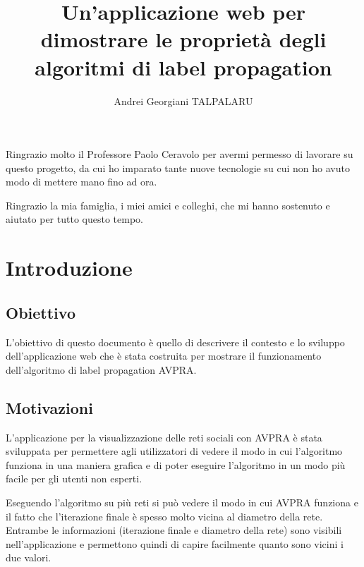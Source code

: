 \documentclass[a4paper,12pt]{report}
\begin{document}

\setcounter{secnumdepth}{5}
\setcounter{tocdepth}{5}

\title{Un'applicazione web per dimostrare le proprietà degli algoritmi di label propagation}
\author{Andrei Georgiani TALPALARU}

\beforepreface
{}
Ringrazio molto il Professore Paolo Ceravolo per avermi permesso di lavorare su questo progetto, da cui ho imparato tante nuove tecnologie su cui non ho avuto modo di mettere mano fino ad ora. 

Ringrazio la mia famiglia, i miei amici e colleghi, che mi hanno sostenuto e aiutato per tutto questo tempo.
\afterpreface
% 
% 
%		
\chapter{Introduzione}

\section{Obiettivo}
L'obiettivo di questo documento è quello di descrivere il contesto e lo sviluppo dell'applicazione web che è stata costruita per mostrare il funzionamento dell'algoritmo di label propagation AVPRA.

\section{Motivazioni}
L'applicazione per la visualizzazione delle reti sociali con AVPRA è stata sviluppata per permettere agli utilizzatori di vedere il modo in cui l'algoritmo funziona in una maniera grafica e di poter eseguire l'algoritmo in un modo più facile per gli utenti non esperti.

Eseguendo l'algoritmo su più reti si può vedere il modo in cui AVPRA funziona e il fatto che l'iterazione finale è spesso molto vicina al diametro della rete. Entrambe le informazioni (iterazione finale e diametro della rete) sono visibili nell'applicazione e permettono quindi di capire facilmente quanto sono vicini i due valori.

\pagebreak
\end{document}
